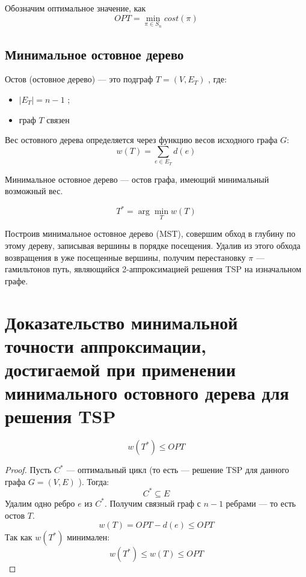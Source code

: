 Обозначим оптимальное значение, как
\begin{equation}
	OPT = \min_{\pi \in S_n} cost(\pi)
\end{equation}

\subsection{Минимальное остовное дерево}

Остов (остовное дерево) --- это подграф $ T = (V, E_T) $ , где:
\begin{itemize}
	\item $ |E_T| = n - 1 $ ;
	\item граф $T$ связен
\end{itemize}

Вес остовного дерева определяется через функцию весов исходного графа $ G $:
\begin{equation}
	w(T) = \sum_{e \in E_T} d(e)
\end{equation}

Минимальное остовное дерево --- остов графа, имеющий минимальный возможный вес.

\begin{equation}
	T^{*} = \arg \min_T w(T)
\end{equation}

Построив минимальное остовное дерево (MST), совершим обход в глубину по этому дереву, записывая вершины в порядке посещения. Удалив из этого обхода возвращения в уже посещенные вершины, получим перестановку $\pi$ --- гамильтонов путь, являющийся 2-аппроксимацией решения TSP на изначальном графе.

\section{Доказательство минимальной точности аппроксимации, достигаемой при применении минимального остовного дерева для решения TSP}

\begin{lemma}
	$$
		w(T^{*}) \leq OPT
	$$
\end{lemma}
\begin{proof}
	Пусть $ C^{*} $ --- оптимальный цикл (то есть --- решение TSP для данного графа $ G = (V, E) $ ). Тогда:
	$$
		C^{*} \subseteq E
	$$
	Удалим одно ребро $e$ из $ C^{*} $. Получим связный граф с $n-1$ ребрами --- то есть остов $T$.
	$$
		w(T) = OPT - d(e) \leq OPT
	$$
	Так как $ w(T^{*}) $ минимален:
	$$
		w(T^{*}) \leq w(T) \leq OPT
	$$
\end{proof}

